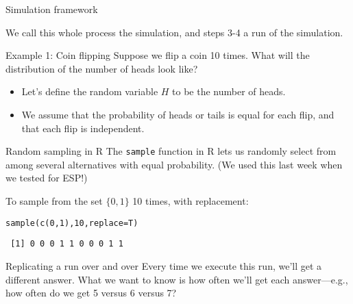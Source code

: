 \documentclass{beamer}\usepackage[]{graphicx}\usepackage[]{color}
\makeatletter
\newcommand{\hlnum}[1]{\textcolor[rgb]{0.824,0.412,0.118}{#1}}%
\newcommand{\hlstd}[1]{\textcolor[rgb]{1,0.894,0.769}{#1}}%
\newcommand{\hlkwc}[1]{\textcolor[rgb]{0.78,0.941,0.545}{#1}}%
\newcommand{\hlkwd}[1]{\textcolor[rgb]{1,0.78,0.769}{#1}}%
\newenvironment{kframe}{%
 \def\at@end@of@kframe{}%
 \ifinner\ifhmode%
  \def\at@end@of@kframe{\end{minipage}}%
  \begin{minipage}{\columnwidth}%
 \fi\fi%
 \def\FrameCommand##1{\hskip\@totalleftmargin \hskip-\fboxsep
 \colorbox{shadecolor}{##1}\hskip-\fboxsep
     \hskip-\linewidth \hskip-\@totalleftmargin \hskip\columnwidth}%
 \MakeFramed {\advance\hsize-\width
   \@totalleftmargin\z@ \linewidth\hsize
   \@setminipage}}%
 {\par\unskip\endMakeFramed%
 \at@end@of@kframe}
\newenvironment{knitrout}{}{} %
\makeatother
\begin{document}
\begin{darkframes}
\begin{frame}{Simulation framework}
      \pause

      We call this whole process the \alert{simulation}, and steps 3-4 a \alert{run} of the simulation.
    \end{frame}

    \begin{frame}{Example 1: Coin flipping}
      Suppose we flip a coin 10 times. What will the distribution of the number of heads look like?

      \pause

      \begin{itemize}[<+->]
        \item Let's define the random variable $H$ to be the number of heads.
        \item We assume that the probability of heads or tails is equal for each flip, and that each flip is independent.
      \end{itemize}
    \end{frame}

    \begin{frame}[fragile]{Random sampling in R}
      The \texttt{sample} function in R lets us randomly select from among several alternatives with equal probability. (We used this last week when we tested for ESP!)

      \bigskip

      To sample from the set $\{0,1\}$ 10 times, with replacement:

\begin{knitrout}
\begin{kframe}
\begin{alltt}
\hlkwd{sample}\hlstd{(}\hlkwd{c}\hlstd{(}\hlnum{0}\hlstd{,} \hlnum{1}\hlstd{),} \hlnum{10}\hlstd{,} \hlkwc{replace}\hlstd{=T)}
\end{alltt}
\begin{verbatim}
 [1] 0 0 0 1 1 0 0 0 1 1
\end{verbatim}
\end{kframe}
\end{knitrout}
    \end{frame}

    \begin{frame}[fragile]{Replicating a run over and over}
      Every time we execute this run, we'll get a different answer. What we want to know is how often we'll get each answer---e.g., how often do we get 5 versus 6 versus 7?

      \bigskip\pause


\end{frame}
\end{darkframes}
\end{document}
